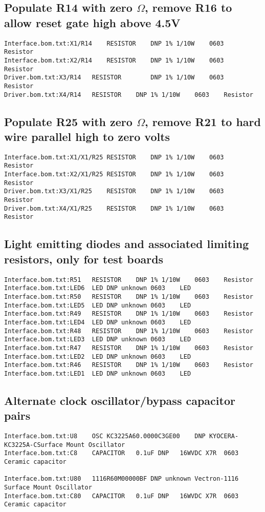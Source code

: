 \documentclass[11pt]{article}
\begin{document}
\subsection{Populate R14 with zero $\Omega$, remove R16 to allow reset gate high above 4.5V}
\begin{verbatim}
Interface.bom.txt:X1/R14	RESISTOR	DNP	1% 1/10W	0603	Resistor	
Interface.bom.txt:X2/R14	RESISTOR	DNP	1% 1/10W	0603	Resistor	
Driver.bom.txt:X3/R14	RESISTOR		DNP	1% 1/10W	0603	Resistor	
Driver.bom.txt:X4/R14	RESISTOR	DNP	1% 1/10W	0603	Resistor	
\end{verbatim}
\subsection{Populate R25 with zero $\Omega$, remove R21 to hard wire parallel high to zero volts}
\begin{verbatim}
Interface.bom.txt:X1/X1/R25	RESISTOR	DNP	1% 1/10W	0603	Resistor	
Interface.bom.txt:X2/X1/R25	RESISTOR	DNP	1% 1/10W	0603	Resistor	
Driver.bom.txt:X3/X1/R25	RESISTOR	DNP	1% 1/10W	0603	Resistor	
Driver.bom.txt:X4/X1/R25	RESISTOR	DNP	1% 1/10W	0603	Resistor	
\end{verbatim}

\subsection{Light emitting diodes and associated limiting resistors, only for test boards}
\begin{verbatim}
Interface.bom.txt:R51	RESISTOR	DNP	1% 1/10W	0603	Resistor	
Interface.bom.txt:LED6	LED	DNP	unknown	0603	LED	
Interface.bom.txt:R50	RESISTOR	DNP	1% 1/10W	0603	Resistor	
Interface.bom.txt:LED5	LED	DNP	unknown	0603	LED	
Interface.bom.txt:R49	RESISTOR	DNP	1% 1/10W	0603	Resistor	
Interface.bom.txt:LED4	LED	DNP	unknown	0603	LED	
Interface.bom.txt:R48	RESISTOR	DNP	1% 1/10W	0603	Resistor	
Interface.bom.txt:LED3	LED	DNP	unknown	0603	LED	
Interface.bom.txt:R47	RESISTOR	DNP	1% 1/10W	0603	Resistor	
Interface.bom.txt:LED2	LED	DNP	unknown	0603	LED	
Interface.bom.txt:R46	RESISTOR	DNP	1% 1/10W	0603	Resistor	
Interface.bom.txt:LED1	LED	DNP	unknown	0603	LED	
\end{verbatim}

\subsection{Alternate clock oscillator/bypass capacitor pairs}
\begin{verbatim}
Interface.bom.txt:U8	OSC	KC3225A60.0000C3GE00	DNP	KYOCERA-KC3225A-CSurface Mount Oscillator
Interface.bom.txt:C8	CAPACITOR	0.1uF DNP	16WVDC X7R	0603	Ceramic capacitor	

Interface.bom.txt:U80	1116R60M00000BF	DNP	unknown	Vectron-1116	Surface Mount Oscillator	
Interface.bom.txt:C80	CAPACITOR	0.1uF DNP	16WVDC X7R	0603	Ceramic capacitor	
\end{verbatim}
\end{document}
